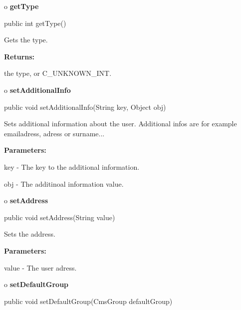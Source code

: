 o {\bf getType} 

\begin{PRE}
 public int getType()
\end{PRE}

\begin{description}
\htmlDD Gets the type. 

\begin{description}
\item {\bf Returns:}  

the type, or C\_UNKNOWN\_INT.  
\end{description}

\end{description}

o {\bf setAdditionalInfo} 

\begin{PRE}
 public void setAdditionalInfo(String key,
                               Object obj)
\end{PRE}

\begin{description}
\htmlDD Sets additional information about the user. Additional infos are for
example emailadress, adress or surname... 

\begin{description}
\item {\bf Parameters:}  

key - The key to the additional information.  

obj - The additinoal information value.  
\end{description}

\end{description}

o {\bf setAddress} 

\begin{PRE}
 public void setAddress(String value)
\end{PRE}

\begin{description}
\htmlDD Sets the address. 

\begin{description}
\item {\bf Parameters:}  

value - The user adress.  
\end{description}

\end{description}

o {\bf setDefaultGroup} 

\begin{PRE}
 public void setDefaultGroup(CmsGroup defaultGroup)
\end{PRE}

